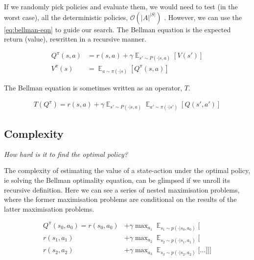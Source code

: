 If we randomly pick policies and evaluate them, we would need to test (in the worst case),
all the deterministic policies, $\mathcal O(|A|^{|S|})$ . However, we can use the \ref{eq:bellman-eqn} to
guide our search. The Bellman equation is the expected return (value), rewritten in a recursive manner.

\begin{align*}
Q^{\pi}(s, a) &= r(s, a) + \gamma \mathop{\mathbb E}_{s' \sim P(\cdot|s, a)} [V(s')] \label{eq:bellman-eqn}\tag{Bellman equation}\\
V^{\pi}(s) &= \mathop{\mathbb E}_{a \sim \pi(\cdot|s)} [Q^{\pi}(s, a)]
\end{align*}

The Bellman equation is sometimes written as an operator, $T$.

\begin{align*}
T(Q^{\pi}) = r(s, a) + \gamma \mathop{\mathbb E}_{s' \sim P(\cdot|s, a)}\mathop{\mathbb E}_{a'\sim \pi(\cdot | s')} [Q(s', a')]
\end{align*}

\subsection{Complexity}

\begin{displayquote}
  \textsl{How hard is it to find the optimal policy?}
\end{displayquote}

The complexity of estimating the value of a state-action under the optimal policy, ie solving the Bellman optimality
equation, can be glimpsed if we unroll its recursive definition.
Here we can see a series of nested maximisation problems, where the former
maximisation problems are conditional on the results of the latter maximisation problems.

\begin{align*}
Q^{\pi}(s_0, a_0) = r(s_0, a_0) &+ \gamma \mathop{\text{max}}_{a_1} \mathop{\mathbb E}_{s_1\sim p(\cdot | s_0, a_0)} \Bigg[ \\
r(s_1, a_1)  &+ \gamma \mathop{\text{max}}_{a_2} \mathop{\mathbb E}_{s_2\sim p(\cdot | s_1, a_1)} \bigg[\\
r(s_2, a_2)  &+ \gamma \mathop{\text{max}}_{a_3} \mathop{\mathbb E}_{s_3\sim p(\cdot | s_2, a_2)} \Big[
\dots \Big] \bigg] \Bigg]
\end{align*}


